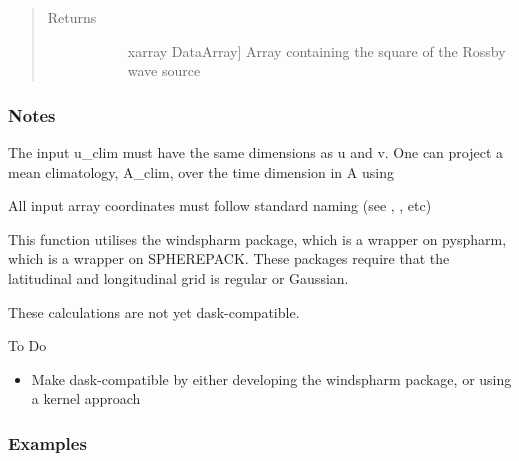 \documentclass[letterpaper,10pt,english]{sphinxmanual}
\begin{document}
\begin{fulllineitems}
\begin{quote}
\begin{description}
\begin{description}
\end{description}

\item[{Returns}] \leavevmode\begin{description}
\item[{}] \leavevmode{[}xarray DataArray{]}
Array containing the square of the Rossby wave source

\end{description}

\end{description}\end{quote}
\subsubsection*{Notes}

\begin{DUlineblock}{0em}
\item[] The input u\_clim must have the same dimensions as u and v. One can project a mean climatology,                 A\_clim, over the time dimension in A using 
\item[] All input array coordinates must follow standard naming (see ,                 , etc)
\item[] This function utilises the windspharm package, which is a wrapper on pyspharm, which is a                 wrapper on SPHEREPACK. These packages require that the latitudinal and longitudinal grid                 is regular or Gaussian.
\item[] These calculations are not yet dask-compatible.
\end{DUlineblock}

To Do
\begin{itemize}
\item {} 
Make dask-compatible by either developing the windspharm package, or using a kernel approach

\end{itemize}
\subsubsection*{Examples}


\end{fulllineitems}
\end{document}
